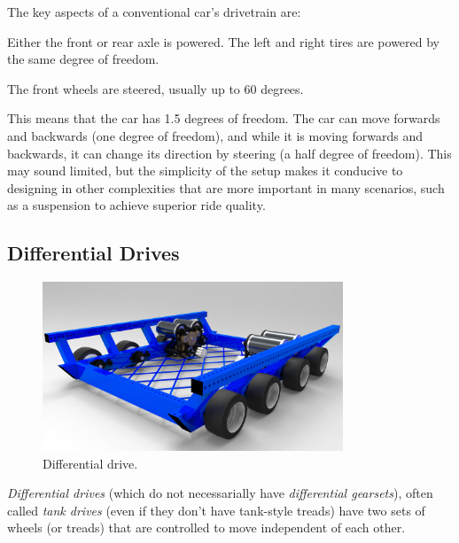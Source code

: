 The key aspects of a conventional car's drivetrain are:
\begin{asparaenum}
	\item Either the front or rear axle is powered. The left and right tires are powered by the same degree of freedom.
	\item The front wheels are steered, usually up to 60 degrees.
\end{asparaenum}

This means that the car has 1.5 degrees of freedom. The car can move forwards and backwards (one degree of freedom), and while it is moving forwards and backwards, it can change its direction by steering (a half degree of freedom). This may sound limited, but the simplicity of the setup makes it conducive to designing in other complexities that are more important in many scenarios, such as a suspension to achieve superior ride quality.

\subsection{Differential Drives}
\begin{figure}[H]
	\includegraphics[width=0.8\textwidth]{imgs/drivetrain_differential.jpeg}
	\caption{Differential drive.}
\end{figure}

\textit{Differential drives} (which do not necessarially have \textit{differential gearsets}), often called \textit{tank drives} (even if they don't have tank-style treads) have two sets of wheels (or treads) that are controlled to move independent of each other.

